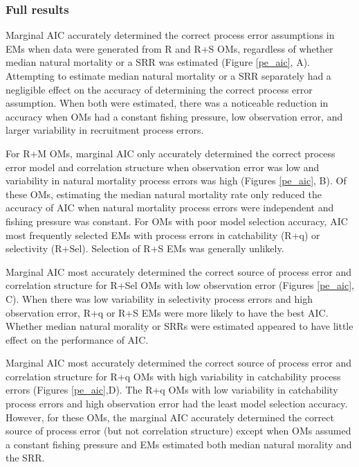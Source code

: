 \documentclass[
  12pt,
]{article}
\begin{document}
\hypertarget{full-results-1}{%
\subsubsection*{Full results}\label{full-results-1}}

Marginal AIC accurately determined the correct process error assumptions
in EMs when data were generated from R and R+S OMs, regardless of
whether median natural mortality or a SRR was estimated (Figure
\ref{pe_aic}, A). Attempting to estimate median natural mortality or a
SRR separately had a negligible effect on the accuracy of determining
the correct process error assumption. When both were estimated, there
was a noticeable reduction in accuracy when OMs had a constant fishing
pressure, low observation error, and larger variability in recruitment
process errors.

For R+M OMs, marginal AIC only accurately determined the correct process
error model and correlation structure when observation error was low and
variability in natural mortality process errors was high (Figures
\ref{pe_aic}, B). Of these OMs, estimating the median natural mortality
rate only reduced the accuracy of AIC when natural mortality process
errors were independent and fishing pressure was constant. For OMs with
poor model selection accuracy, AIC most frequently selected EMs with
process errors in catchability (R+q) or selectivity (R+Sel). Selection
of R+S EMs was generally unlikely.

Marginal AIC most accurately determined the correct source of process
error and correlation structure for R+Sel OMs with low observation error
(Figures \ref{pe_aic}, C). When there was low variability in selectivity
process errors and high observation error, R+q or R+S EMs were more
likely to have the best AIC. Whether median natural morality or SRRs
were estimated appeared to have little effect on the performance of AIC.

Marginal AIC most accurately determined the correct source of process
error and correlation structure for R+q OMs with high variability in
catchability process errors (Figures \ref{pe_aic},D). The R+q OMs with
low variability in catchability process errors and high observation
error had the least model selection accuracy. However, for these OMs,
the marginal AIC accurately determined the correct source of process
error (but not correlation structure) except when OMs assumed a constant
fishing pressure and EMs estimated both median natural morality and the
SRR.
\end{document}
